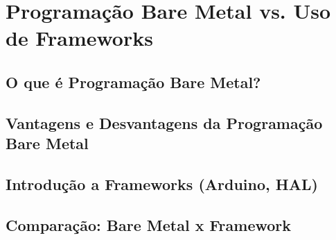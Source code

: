 \section{Programação Bare Metal vs. Uso de Frameworks}

\subsection{O que é Programação Bare Metal?}
\subsection{Vantagens e Desvantagens da Programação Bare Metal}
\subsection{Introdução a Frameworks (Arduino, HAL)}
\subsection{Comparação: Bare Metal x Framework}